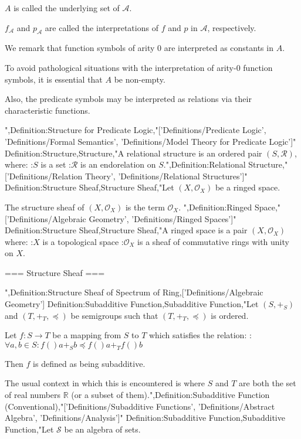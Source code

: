 $A$ is called the underlying set of $\mathcal A$.

$f_\mathcal A$ and $p_\mathcal A$ are called the interpretations of $f$ and $p$ in $\mathcal A$, respectively.


We remark that function symbols of arity $0$ are interpreted as constants in $A$.

To avoid pathological situations with the interpretation of arity-$0$ function symbols, it is essential that $A$ be non-empty.

Also, the predicate symbols may be interpreted as relations via their characteristic functions.


",Definition:Structure for Predicate Logic,"['Definitions/Predicate Logic', 'Definitions/Formal Semantics', 'Definitions/Model Theory for Predicate Logic']"
Definition:Structure,Structure,"A relational structure is an ordered pair $\left( S, \mathcal R \right)$, where:
:$S$ is a set
:$\mathcal R$ is an endorelation on $S$.",Definition:Relational Structure,"['Definitions/Relation Theory', 'Definitions/Relational Structures']"
Definition:Structure Sheaf,Structure Sheaf,"Let $\left( X, \mathcal O_X \right)$ be a ringed space.


The structure sheaf of $\left( X, \mathcal O_X \right)$ is the term $\mathcal O_X$.
",Definition:Ringed Space,"['Definitions/Algebraic Geometry', 'Definitions/Ringed Spaces']"
Definition:Structure Sheaf,Structure Sheaf,"A ringed space is a pair $\left( X, \mathcal O_X \right)$ where:
:$X$ is a topological space
:$\mathcal O_X$ is a sheaf of commutative rings with unity on $X$.



=== Structure Sheaf ===

",Definition:Structure Sheaf of Spectrum of Ring,['Definitions/Algebraic Geometry']
Definition:Subadditive Function,Subadditive Function,"Let $\left( S, +_S \right)$ and $\left( T, +_T, \preceq \right)$ be semigroups such that $\left( T, +_T, \preceq \right)$ is ordered.


Let $f: S \to T$ be a mapping from $S$ to $T$ which satisfies the relation:
:$\forall a, b \in S: f \left(   \right){a +_S b} \preceq f \left(   \right)a +_T f \left(   \right)b$


Then $f$ is defined as being subadditive.


The usual context in which this is encountered is where $S$ and $T$ are both the set of real numbers $\mathbb R$ (or a subset of them).",Definition:Subadditive Function (Conventional),"['Definitions/Subadditive Functions', 'Definitions/Abstract Algebra', 'Definitions/Analysis']"
Definition:Subadditive Function,Subadditive Function,"Let $\mathcal S$ be an algebra of sets.

